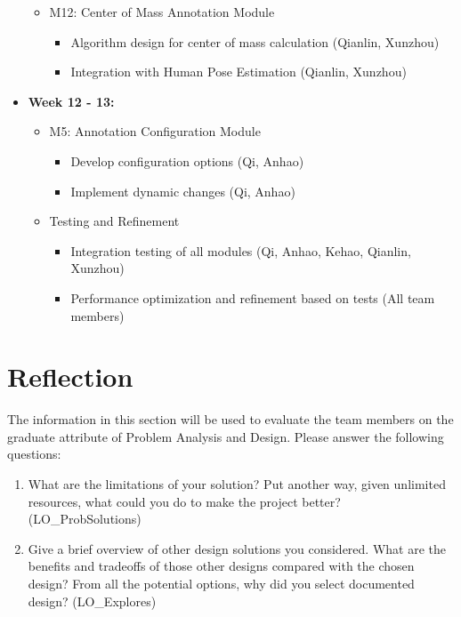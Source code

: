 \documentclass[12pt, titlepage]{article}
\begin{document}
\begin{itemize}
\begin{itemize}
      \item M12: Center of Mass Annotation Module
      \begin{itemize}
          \item Algorithm design for center of mass calculation (Qianlin, Xunzhou)
          \item Integration with Human Pose Estimation (Qianlin, Xunzhou)
      \end{itemize}
  \end{itemize}
  \item \textbf{Week 12 - 13:}
  \begin{itemize}
      \item M5: Annotation Configuration Module
      \begin{itemize}
          \item Develop configuration options (Qi, Anhao)
          \item Implement dynamic changes (Qi, Anhao)
      \end{itemize}
      \item Testing and Refinement
      \begin{itemize}
          \item Integration testing of all modules (Qi, Anhao, Kehao, Qianlin, Xunzhou)
          \item Performance optimization and refinement based on tests (All team members)
      \end{itemize}
  \end{itemize}
\end{itemize}

\section{Reflection}

The information in this section will be used to evaluate the team members on the
graduate attribute of Problem Analysis and Design.  Please answer the following questions:

\begin{enumerate}
  \item What are the limitations of your solution?  Put another way, given
  unlimited resources, what could you do to make the project better? (LO\_ProbSolutions)
  \item Give a brief overview of other design solutions you considered.  What
  are the benefits and tradeoffs of those other designs compared with the chosen
  design?  From all the potential options, why did you select documented design?
  (LO\_Explores)
\end{enumerate}
\end{document}
